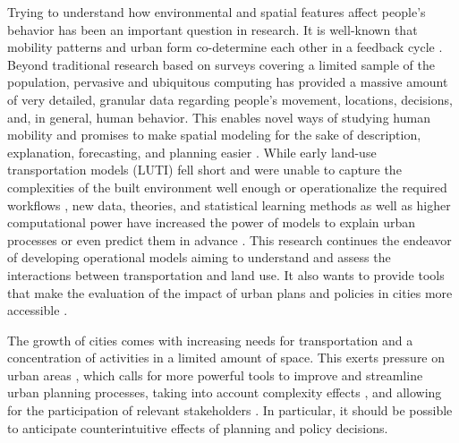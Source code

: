 Trying to understand how environmental and spatial features affect people's behavior has been an important question in research. It is well-known that mobility patterns and urban form co-determine each other \citep{Hansen1959HowUse} in a feedback cycle \citep{Wegener2021Land-UseModels, Crane2000, Ewing2010, Handy2002, Cervero1997}. Beyond traditional research based on surveys covering a limited sample of the population, pervasive and ubiquitous computing has provided a massive amount of very detailed, granular data regarding people's movement, locations, decisions, and, in general, human behavior. This enables novel ways of studying human mobility \citep{Lenormand2015InfluenceMobility} and promises to make spatial modeling for the sake of description, explanation, forecasting, and planning easier \citep{Wegener2001NewModels}. While early land-use transportation models (LUTI) fell short and were unable to capture the complexities of the built environment well enough or operationalize the required workflows \citep{Lee1973RequiemModels}, new data, theories, and statistical learning methods as well as higher computational power have increased the power of models to explain urban processes or even predict them in advance \citep{Fotheringham1989SpatialApplications, Wegener2021Land-UseModels, Acheampong2015}. This research continues the endeavor of developing operational models aiming to understand and assess the interactions between transportation and land use. It also wants to provide tools that make the evaluation of the impact of urban plans and policies in cities more accessible \citep{Cervero1997ParadigmPlanning}.


The growth of cities comes with increasing needs for transportation and a concentration of activities in a limited amount of space. This exerts pressure on urban areas \citep{Newman1998SustainabilityDependence, Echenique2012GrowingSustainably}, which calls for more powerful tools to improve and streamline urban planning processes, taking into account complexity effects %
, and allowing for the participation of relevant stakeholders \citep{Banister2008TheParadigm}. In particular, it should be possible to anticipate counterintuitive effects of planning and policy decisions. 

